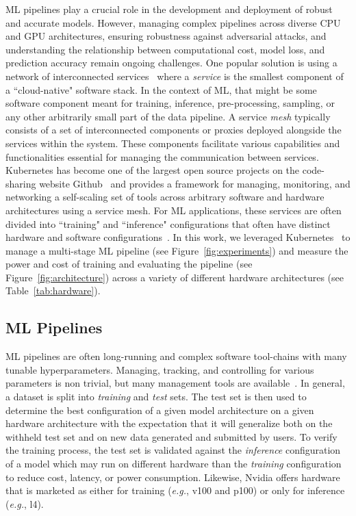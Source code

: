 \documentclass[conference]{IEEEtran}
\begin{document}
ML pipelines play a crucial role in the development and deployment of robust and accurate models. However, managing complex pipelines across diverse CPU and GPU architectures, ensuring robustness against adversarial attacks, and understanding the relationship between computational cost, model loss, and prediction accuracy remain ongoing challenges.
One popular solution is using a network of interconnected services~\cite{panchal2024reusable,hasselbring2017microservice,zhou2022online,singh2023load} where a \textit{service} is the smallest component of a ``cloud-native" software stack. In the context of ML, that might be some software component meant for training, inference, pre-processing, sampling, or any other arbitrarily small part of the data pipeline. 
A service \textit{mesh} typically consists of a set of interconnected components or proxies deployed alongside the services within the system.  These components facilitate various capabilities and functionalities essential for managing the communication between services. Kubernetes has become one of the largest open source projects on the code-sharing website Github~\cite{k8s-size} and provides a framework for managing, monitoring, and networking a self-scaling set of tools across arbitrary software and hardware architectures using a service mesh. For ML applications, these services are often divided into ``training" and ``inference" configurations that often have distinct hardware and software configurations~\cite{wang2019benchmarking}. In this work, we leveraged Kubernetes~\cite{k8s} to manage a multi-stage ML pipeline (see Figure~\ref{fig:experiments}) and measure the power and cost of training and evaluating the pipeline (see Figure~\ref{fig:architecture}) across a variety of different hardware architectures (see Table~\ref{tab:hardware}).


\subsection{ML Pipelines}
ML pipelines are often long-running and complex software tool-chains with many tunable hyperparameters. Managing, tracking, and controlling for various parameters is non trivial, but many management tools are available~\cite{dvc,hydra,k8s}. In general, a dataset is split into \textit{training} and \textit{test} sets. The test set is then used to determine the best configuration of a given model architecture on a given hardware architecture with the expectation that it will generalize both on the withheld test set and on new data generated and submitted by users. To verify the training process, the test set is validated against the \textit{inference} configuration of a model which may run on different hardware than the \textit{training} configuration to reduce cost, latency, or power consumption. Likewise, Nvidia offers hardware that is marketed as either for training (\textit{e.g.}, v100 and p100) or only for inference (\textit{e.g.}, l4).
\end{document}
